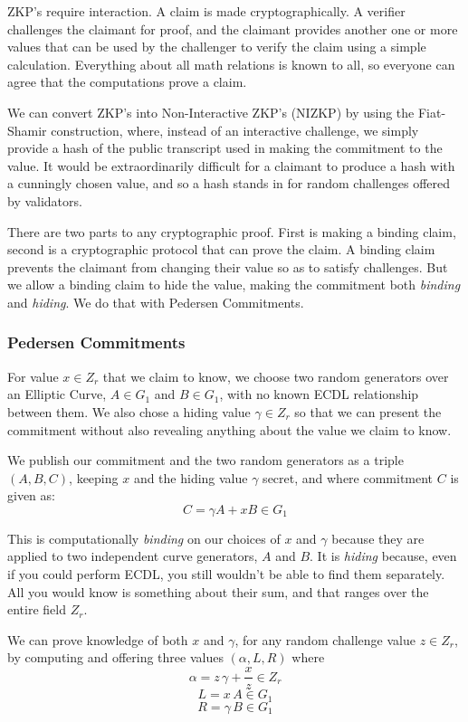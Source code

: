 \documentclass{yellowpaper}
\begin{document}
ZKP's require interaction. A claim is made cryptographically. A verifier challenges the claimant for proof, and the claimant provides another one or more values that can be used by the challenger to verify the claim using a simple calculation. Everything about all math relations is known to all, so everyone can agree that the computations prove a claim.

We can convert ZKP's  into Non-Interactive ZKP's (NIZKP)
 by using the Fiat-Shamir construction, where, instead of an interactive challenge, we simply provide a hash of the public transcript used in making the commitment to the value. It would be extraordinarily difficult for a claimant to produce a hash with a cunningly chosen value, and so a hash stands in for random challenges offered by validators.

There are two parts to any cryptographic proof. First is making a binding claim, second is a cryptographic protocol that can prove the claim. A binding claim prevents the claimant from changing their value so as to satisfy challenges. But we allow a binding claim to hide the value, making the commitment both {\em{binding}} and {\em{hiding}}. We do that with Pedersen Commitments. 

\subsubsection{Pedersen Commitments}
For value $x \in Z_r$ that we claim to know, we choose two random generators over an Elliptic Curve, $A \in G_1$ and $B \in G_1$, with no known ECDL relationship between them. We also chose a hiding value $\gamma \in Z_r$ so that we can present the commitment without also revealing anything about the value we claim to know.
 
We publish our commitment and the two random generators as a triple $(A, B, C)$, keeping $x$ and the hiding value $\gamma$ secret, and where commitment $C$ is given as:
$$C = \gamma A + x B \in G_1$$

This is computationally {\em{binding}} on our choices of $x$ and $\gamma$ because they are applied to two independent curve generators, $A$ and $B$. It is {\em{hiding}} because, even if you could perform ECDL, you still wouldn't be able to find them separately. All you would know is something about their sum, and that ranges over the entire field $Z_r$.

We can prove knowledge of both $x$ and $\gamma$, for any random challenge value $z \in Z_r$, by computing and offering three values $(\alpha, L, R)$ where
$$\alpha = z \, \gamma + \frac{x}{z} \in Z_r$$
$$L = x \, A \in G_1$$
$$R = \gamma \, B \in G_1$$
\end{document}
